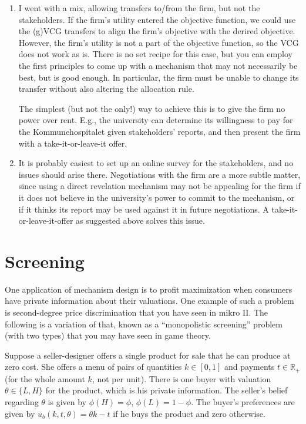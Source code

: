 \documentclass[a4paper]{article}
\begin{document}
\begin{enumerate}
	\item I went with a mix, allowing transfers to/from the firm, but not the stakeholders. If the firm's utility entered the objective function, we could use the (g)VCG transfers to align the firm's objective with the derired objective. However, the firm's utility is not a part of the objective function, so the VCG does not work as is. There is no set recipe for this case, but you can employ the first principles to come up with a mechanism that may not necessarily be best, but is good enough. In particular, the firm must be unable to change its transfer without also altering the allocation rule. 
	
	The simplest (but not the only!) way to achieve this is to give the firm no power over rent. E.g., the university can determine its willingness to pay for the Kommunehospitalet given stakeholders' reports, and then present the firm with a take-it-or-leave-it offer.
	
	\item It is probably easiest to set up an online survey for the stakeholders, and no issues should arise there. Negotiations with the firm are a more subtle matter, since using a direct revelation mechanism may not be appealing for the firm if it does not believe in the university's power to commit to the mechanism, or if it thinks its report may be used against it in future negotiations. A take-it-or-leave-it-offer as suggested above solves this issue. 
\end{enumerate}

\fi



\section{Screening}

One application of mechanism design is to profit maximization when consumers have private information about their valuations. One example of such a problem is second-degree price discrimination that you have seen in mikro II. The following is a variation of that, known as a ``monopolistic screening'' problem (with two types) that you may have seen in game theory.

Suppose a seller-designer offers a single product for sale that he can produce at zero cost. She offers a menu of pairs of quantities $k \in [0,1]$ and payments $t \in \mathbb{R}_+$ (for the whole amount $k$, not per unit). There is one buyer with valuation $\theta \in \{ L,H \}$ for the product, which is his private information. The seller's belief regarding $\theta$ is given by $\phi(H) = \phi$, $\phi(L)=1-\phi$. The buyer's preferences are given by $u_b(k,t,\theta) = \theta k - t$ if he buys the product and zero otherwise.
\end{document}
